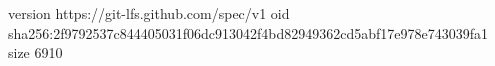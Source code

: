 version https://git-lfs.github.com/spec/v1
oid sha256:2f9792537c844405031f06dc913042f4bd82949362cd5abf17e978e743039fa1
size 6910
